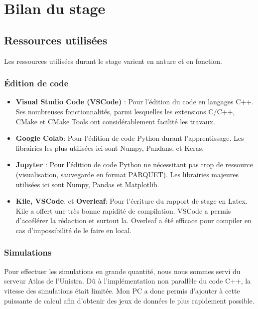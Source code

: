 
\chapter{Bilan du stage} %

\label{Chapter5} %


\section{Ressources utilisées}

Les ressources utilisées durant le stage varient en nature et en fonction.

\subsection{Édition de code}
\begin{itemize}
 \item \textbf{Visual Studio Code (VSCode)} : Pour l'édition du code en langages C++. Ses nombreuses fonctionnalités, parmi lesquelles les extensions C/C++, CMake et CMake Tools ont considérablement facilité les travaux.
 \item \textbf{Google Colab}: Pour l'édition de code Python durant l'apprentissage. Les librairies les plus utilisées ici sont Numpy, Pandans, et Keras.
 \item \textbf{Jupyter} : Pour l'édition de code Python ne nécessitant pas trop de ressource (visualisation, sauvegarde en format PARQUET). Les librairies majeures utilisées ici sont Numpy, Pandas et Matplotlib.
 \item \textbf{Kile, VSCode}, et \textbf{Overleaf}: Pour l'écriture du rapport de stage en Latex. Kile a offert une très bonne rapidité de compilation. VSCode a permis d'accélérer la rédaction et surtout la. Overleaf a été efficace pour compiler en cas d'impossibilité de le faire en local.
\end{itemize}

\subsection{Simulations}
Pour effectuer les simulations en grande quantité, nous nous sommes servi du serveur Atlas de l'Unistra. Dû à l'implémentation non parallèle du code C++, la vitesse des simulations était limitée. Mon PC a donc permis d'ajouter à cette puissante de calcul afin d'obtenir des jeux de données le plus rapidement possible. 

